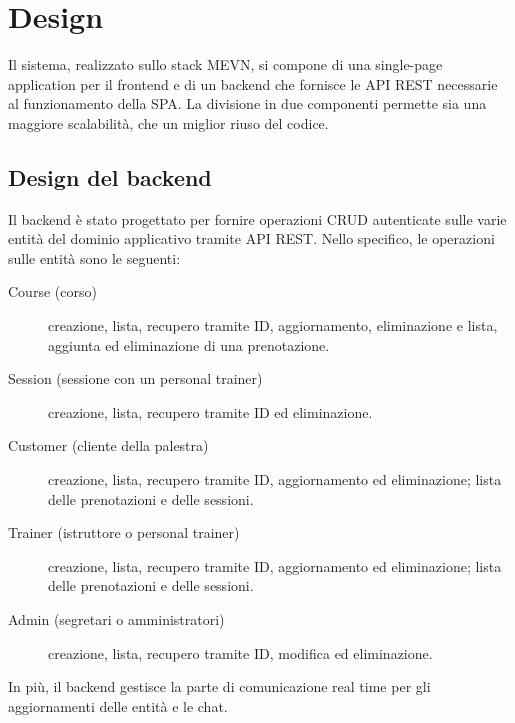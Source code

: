 \documentclass{report}
\begin{document}
\section{Design}
\par Il sistema, realizzato sullo stack MEVN, si compone di una single-page application per il frontend e di un backend che fornisce le API REST necessarie al funzionamento della SPA. La divisione in due componenti permette sia una maggiore scalabilità, che un miglior riuso del codice.
\subsection{Design del backend}
\par Il backend è stato progettato per fornire operazioni CRUD autenticate sulle varie entità del dominio applicativo tramite API REST. Nello specifico, le operazioni sulle entità sono le seguenti:
\begin{description}
    \item[Course (corso)] creazione, lista, recupero tramite ID, aggiornamento, eliminazione e lista, aggiunta ed eliminazione di una prenotazione.
    \item[Session (sessione con un personal trainer)] creazione, lista, recupero tramite ID ed eliminazione.
    \item[Customer (cliente della palestra)] creazione, lista, recupero tramite ID, aggiornamento ed eliminazione; lista delle prenotazioni e delle sessioni.
    \item[Trainer (istruttore o personal trainer)] creazione, lista, recupero tramite ID, aggiornamento ed eliminazione; lista delle prenotazioni e delle sessioni.
    \item[Admin (segretari o amministratori)] creazione, lista, recupero tramite ID, modifica ed eliminazione.
\end{description}
\par In più, il backend gestisce la parte di comunicazione real time per gli aggiornamenti delle entità e le chat.
\end{document}
